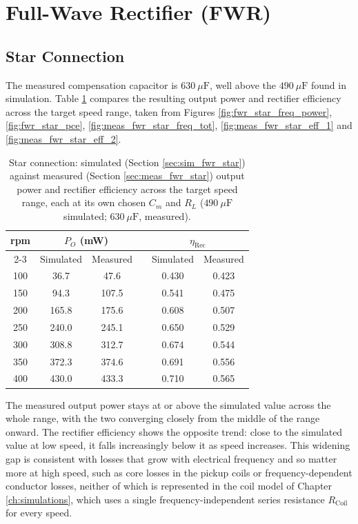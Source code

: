 \section{Full-Wave Rectifier (FWR)}
\label{sec:comp_fwr}

\subsection{Star Connection}
\label{sec:comp_fwr_star}

The measured compensation capacitor is $630\ \mu\text{F}$, well above the $490\ \mu\text{F}$ found in simulation. Table \ref{tab:comp_fwr_star} compares the resulting output power and rectifier efficiency across the target speed range, taken from Figures \ref{fig:fwr_star_freq_power}, \ref{fig:fwr_star_pce}, \ref{fig:meas_fwr_star_freq_tot}, \ref{fig:meas_fwr_star_eff_1} and \ref{fig:meas_fwr_star_eff_2}.

\begin{table}[htbp]
    \centering
    \begin{tabular}{cccccc}
        \toprule
        \multirow{2}{*}{rpm} & \multicolumn{2}{c}{$P_O$ (mW)} & & \multicolumn{2}{c}{$\eta_\text{Rec}$} \\
        \cmidrule{2-3} \cmidrule{5-6}
        & Simulated & Measured & & Simulated & Measured \\
        \midrule
        100 & 36.7  & 47.6  & & 0.430 & 0.423 \\
        150 & 94.3  & 107.5 & & 0.541 & 0.475 \\
        200 & 165.8 & 175.6 & & 0.608 & 0.507 \\
        250 & 240.0 & 245.1 & & 0.650 & 0.529 \\
        300 & 308.8 & 312.7 & & 0.674 & 0.544 \\
        350 & 372.3 & 374.6 & & 0.691 & 0.556 \\
        400 & 430.0 & 433.3 & & 0.710 & 0.565 \\
        \bottomrule
    \end{tabular}
    \caption{Star connection: simulated (Section \ref{sec:sim_fwr_star}) against measured (Section \ref{sec:meas_fwr_star}) output power and rectifier efficiency across the target speed range, each at its own chosen $C_m$ and $R_L$ ($490\ \mu\text{F}$ simulated; $630\ \mu\text{F}$, measured).}
    \label{tab:comp_fwr_star}
\end{table}

The measured output power stays at or above the simulated value across the whole range, with the two converging closely from the middle of the range onward. The rectifier efficiency shows the opposite trend: close to the simulated value at low speed, it falls increasingly below it as speed increases. This widening gap is consistent with losses that grow with electrical frequency and so matter more at high speed, such as core losses in the pickup coils or frequency-dependent conductor losses, neither of which is represented in the coil model of Chapter \ref{ch:simulations}, which uses a single frequency-independent series resistance $R_\text{Coil}$ for every speed.

